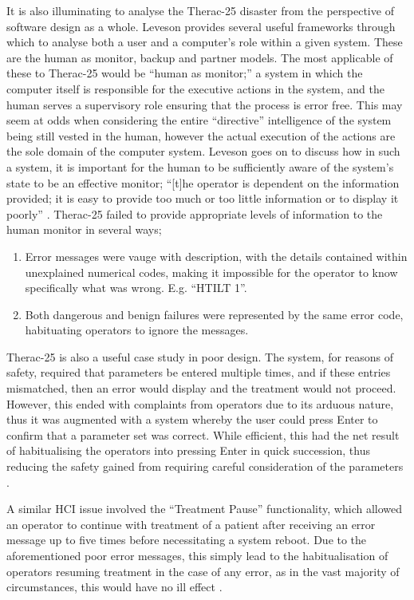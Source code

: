 \documentclass{cshonours}
\newcommand{\ther}{Therac-25\xspace}
\begin{document}
It is also illuminating to analyse the \ther disaster from the perspective of software design as a whole. Leveson \cite{safeware} provides several useful frameworks through which to analyse both a user and a computer's role within a given system. These are the human as monitor, backup and partner models. The most applicable of these to \ther would be ``human as monitor;'' a system in which the computer itself is responsible for the executive actions in the system, and the human serves a supervisory role ensuring that the process is error free. This may seem at odds when considering the entire ``directive'' intelligence of the system being still vested in the human, however the actual execution of the actions are the sole domain of the computer system. Leveson goes on to discuss how in such a system, it is important for the human to be sufficiently aware of the system's state to be an effective monitor; ``[t]he operator is dependent on the information provided; it is easy to provide too much or too little information or to display it poorly'' \cite[p.~114]{safeware}. \ther failed to provide appropriate levels of information to the human monitor in several ways;
\begin{enumerate}
  \item Error messages were vauge with description, with the details contained within unexplained numerical codes, making it impossible for the operator to know specifically what was wrong. E.g. ``HTILT 1''.
  \item Both dangerous and benign failures were represented by the same error code, habituating operators to ignore the messages.
\end{enumerate}

\ther is also a useful case study in poor \hci design. The system, for reasons of safety, required that parameters be entered multiple times, and if these entries mismatched, then an error would display and the treatment would not proceed. However, this ended with complaints from operators due to its arduous nature, thus it was augmented with a system whereby the user could press Enter to confirm that a parameter set was correct. While efficient, this had the net result of habitualising the operators into pressing Enter in quick succession, thus reducing the safety gained from requiring careful consideration of the parameters \cite[p.~274]{saferworld}.

A similar HCI issue involved the ``Treatment Pause'' functionality, which allowed an operator to continue with treatment of a patient after receiving an error message up to five times before necessitating a system reboot. Due to the aforementioned poor error messages, this simply lead to the habitualisation of operators resuming treatment in the case of any error, as in the vast majority of circumstances, this would have no ill effect \cite[p.~301]{saferworld}.
\end{document}
